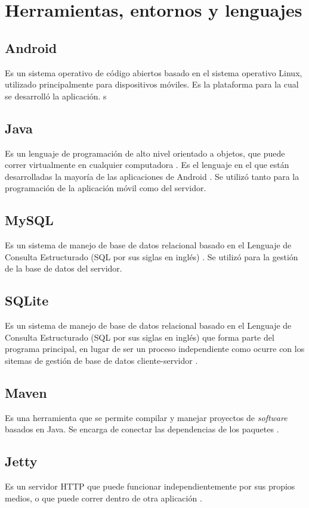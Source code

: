 \section{Herramientas, entornos y lenguajes} \label{Herramientas, entornos y lenguajes}


\subsection{Android}
Es un sistema operativo de código abiertos basado en el sistema operativo Linux, utilizado principalmente para dispositivos móviles\cite{AND1}. Es la plataforma para la cual se desarrolló la aplicación.
s
\subsection{Java}
Es un lenguaje de programación de alto nivel orientado a objetos, que puede correr virtualmente en cualquier computadora \cite{JAV1}. Es el lenguaje en el que están desarrolladas la mayoría de las aplicaciones de Android \cite{AND2}. Se utilizó tanto para la programación de la aplicación móvil como del servidor.

\subsection{MySQL} 
Es un sistema de manejo de base de datos relacional basado en el Lenguaje de Consulta Estructurado (SQL por sus siglas en inglés) \cite{SQL1}. Se utilizó para la gestión de la base de datos del servidor.

\subsection{SQLite}
Es un sistema de manejo de base de datos relacional basado en el Lenguaje de Consulta Estructurado (SQL por sus siglas en inglés) que forma parte del programa principal, en lugar de ser un proceso independiente como ocurre con los sitemas de gestión de base de datos cliente-servidor \cite{SQL2}.

\subsection{Maven}
Es una herramienta que se permite compilar y  manejar proyectos de \textit{software} basados en Java. Se encarga de conectar las dependencias de los paquetes \cite{MVN1}.

\subsection{Jetty}
Es un servidor HTTP que puede funcionar independientemente por sus propios medios, o que puede correr dentro de otra aplicación \cite{JTY1}.

